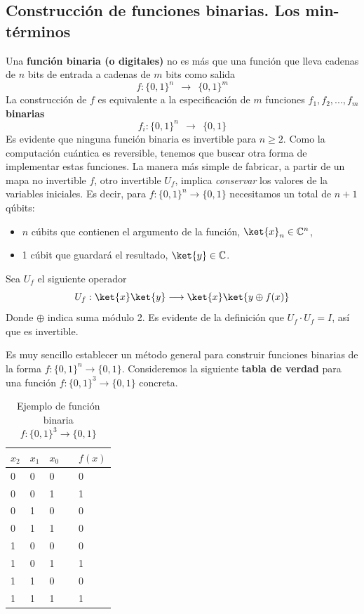 \documentclass[a4paper,11pt]{book} %
\numberwithin{equation}{chapter}
\begin{document}
    	\subsection{Construcción de funciones binarias. Los min-términos}

Una \textbf{función binaria (o digitales)} no es más que una función que lleva cadenas de $n$ bits de entrada a cadenas de $m$ bits como salida
\begin{equation}
f : \{0,1\}^n ~~\to ~~\{0,1\}^m
\end{equation}
La construcción de $f$ es equivalente a la especificación de $m$ funciones  $f_1,f_2,...,f_m$ \textbf{binarias}
\begin{equation}
f_i : \{0,1\}^n ~~\to ~~\{0,1\}
\end{equation} 
Es evidente que ninguna función binaria es invertible para $n\geq 2$. Como la computación cuántica es reversible, tenemos que buscar otra forma de implementar estas funciones. La manera más simple de fabricar, a partir de un mapa no invertible $f$, otro invertible $U_f$, implica \textit{conservar} los valores de la variables iniciales. Es decir, para $f:\{0,1\}^n \to \{0,1\}$ necesitamos un total de $n+1$ qúbits:
\begin{itemize}
	\item $n$ cúbits que contienen el argumento de la función, $\ket{x}_n \in \mathbb{C}^n$, 
	\item 1 cúbit que guardará el resultado, $\ket{y} \in \mathbb{C}$.
\end{itemize}
Sea $U_f$ el siguiente operador
	\begin{equation} \label{ec_InicialOracle_Uf}
	U_f : \ket{x}\ket{y} \longrightarrow \ket{x} \ket{ y \oplus f(x) }
	\end{equation}
Donde $\oplus$ indica suma módulo 2. Es evidente de la definición que $U_f\cdot U_f = I$, así que es invertible.

Es muy sencillo establecer un método general para construir funciones binarias de la forma $f: \{0, 1\}^n \rightarrow \{0, 1\}$. Consideremos la siguiente \textbf{tabla de verdad} para una función $f: \{0, 1\}^3 \rightarrow \{0, 1\}$ concreta.

\begin{table}[H]
\centering
\begin{tabular}{lllll}
$x_2$ & $x_1$ & $x_0$ & & $f(x)$ \\ \hline
 0&0&0 &&0\\
 0&0&1 &&1\\
 0&1&0 &&0\\
 0&1&1 &&0\\
 1&0&0 &&0\\
 1&0&1 &&1\\
 1&1&0 &&0\\
 1&1&1 &&1\\ \hline
\end{tabular}
\caption{Ejemplo de función binaria $f: \{0, 1\}^3 \rightarrow \{0, 1\}$}
\label{Tab_InitialOracle_f_bin_1}
\end{table}
\end{document}
